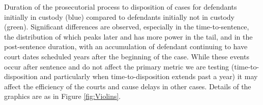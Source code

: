 Duration of the prosecutorial process to disposition of cases for defendants initially in custody (blue) compared to defendants initially not in custody (green). Significant differences are observed, especially in the time-to-sentence, the distribution of which peaks later and has more power in the tail, and in the post-sentence duration, with an accumulation of defendant continuing to have court dates scheduled years after the beginning of the case. While these events occur after sentence and do not affect the primary metric we are testing (time-to-disposition and particularly when time-to-disposition extends past a year) it may affect the efficiency of the courts and cause delays in other cases. Details of the graphics are as in Figure \ref{fig:Violins}.
\label{fig:ViolinsCompetency}